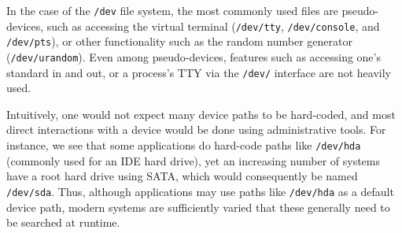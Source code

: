 




In the case of the {\tt /dev} file system, the most commonly used files are pseudo-devices, such as accessing
the virtual terminal ({\tt /dev/tty}, {\tt /dev/console}, and {\tt /dev/pts}), or other functionality 
such as the random number generator ({\tt /dev/urandom}).
Even among pseudo-devices, features such as accessing one's standard in and out, or a process's TTY
via the {\tt /dev/} interface are not heavily used.

Intuitively, one would not expect many device paths to be hard-coded, and most direct interactions 
with a device would be done using administrative tools.
For instance, we see that some applications do hard-code paths like {\tt /dev/hda} (commonly used for an IDE hard drive),
yet an increasing number of systems have a root hard drive using SATA, which would consequently be named {\tt /dev/sda}.
Thus, although applications may use paths like {\tt /dev/hda} as a default device path, modern systems are sufficiently varied
that these generally need to be searched at runtime.

